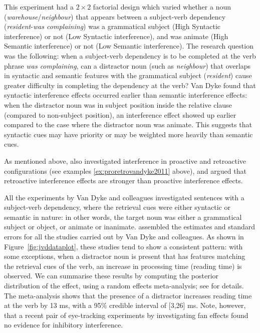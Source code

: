 \documentclass{cambridge7A}\usepackage[]{graphicx}\usepackage[]{color}
\begin{document}
This experiment had a $2\times 2$ factorial design which varied whether a noun (\textit{warehouse}/\textit{neighbour})  that appears between a subject-verb dependency (\textit{resident}-\textit{was complaining}) was a grammatical subject (High Syntactic interference) or not (Low Syntactic interference), and was animate (High Semantic interference) or not (Low Semantic interference).  The research question was the following: when a subject-verb dependency is to be completed at the verb phrase \textit{was complaining}, can a distractor noun (such as \textit{neighbour}) that overlaps in syntactic and semantic features with the grammatical subject (\textit{resident}) cause greater difficulty in completing the dependency at the verb?
Van Dyke found that syntactic interference effects occurred earlier than semantic interference effects: when the distractor noun was in subject position inside the relative clause (compared to non-subject position), an interference effect showed up earlier compared to the case where the distractor noun was animate. This suggests that syntactic cues may have priority or may be weighted more heavily than semantic cues.

As mentioned above, 
\cite{VanDykeMcElree2011} also investigated interference in  proactive and  retroactive configurations (see examples \ref{ex:proretrovandyke2011} above), and argued that  retroactive interference effects are stronger than  proactive interference effects.



All the experiments by Van Dyke and colleagues investigated sentences with a subject-verb dependency, where the retrieval cues were either syntactic or semantic in nature:  in other words, the target noun was either a grammatical subject or object,  or animate or inanimate. \cite{JaegerEngelmannVasishth2017} assembled the estimates and standard errors for all the studies carried out by Van Dyke and colleagues. As shown in Figure~\ref{fig:jvddataplot}, these studies tend to show a consistent pattern: with some exceptions, when a distractor noun is present that has features matching the retrieval cues of the verb, an increase in processing time (reading time) is observed. 
We can summarise these results by computing the posterior distribution of the effect, using a random effects  meta-analysis; see \cite{JaegerEngelmannVasishth2017} for details. The meta-analysis shows that the presence of a distractor increases reading time at the verb by 13 ms, with a 95\% credible interval of [3,26] ms. Note, however, that a recent pair of eye-tracking experiments by \cite{CunningsSturt2018} investigating fan effects found no evidence  for inhibitory interference.  
\end{document}
